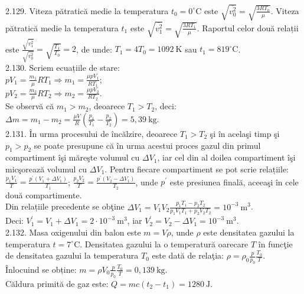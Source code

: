 2.129. Viteza pătratică medie la temperatura $t_{0}=0^{\circ} \mathrm{C}$ este $\sqrt{\overline{v_{0}^{2}}}=\sqrt{\frac{3 R T_{0}}{\mu}}$. Viteza pătratică medie la temperatura $t_{1}$ este $\sqrt{\overline{v_{1}^{2}}}=\sqrt{\frac{3 R T_{1}}{\mu}}$. Raportul celor două relații este $\frac{\sqrt{\overline{v_{1}^{2}}}}{\sqrt{\overline{v_{0}^{2}}}}=\sqrt{\frac{T_{1}}{T_{0}}}=2$, de unde: $T_{1}=4 T_{0}=1092 \mathrm{~K}$ sau $t_{1}=819^{\circ} \mathrm{C}$.\\

2.130. Scriem ecuațiile de stare:\\ $p V_{1}=\frac{m_{1}}{\mu} R T_{1} \Rightarrow m_{1}=\frac{\mu p V_{1}}{R T_{1}}$;\\ $p V_{2}=\frac{m_{2}}{\mu} R T_{2} \Rightarrow m_{2}=\frac{\mu p V_{2}}{R T_{2}}$.\\ Se observă că $m_{1}>m_{2}$, deoarece $T_{1}>T_{2}$, deci:\\ $\Delta m=m_{1}-m_{2}=\frac{\mu V}{R}\left(\frac{p_{1}}{T_{1}}-\frac{p_{2}}{T_{2}}\right)=5,39 \mathrm{~kg}$.\\

2.131. În urma procesului de încălzire, deoarece $T_{1}>T_{2}$ şi în acelaşi timp şi $p_{1}>p_{2}$ se poate presupune că în urma acestui proces gazul din primul compartiment îşi măreşte volumul cu $\Delta V_{1}$, iar cel din al doilea compartiment îşi micşorează volumul cu $\Delta V_{1}$. Pentru fiecare compartiment se pot scrie relațiile:\\ $\frac{p_{1} V_{1}}{T}=\frac{p^{\prime}\left(V_{1}+\Delta V_{1}\right)}{T_{1}}$; \quad $\frac{p_{2} V_{2}}{T}=\frac{p^{\prime}\left(V_{2}-\Delta V_{1}\right)}{T_{2}}$, unde $p^{\prime}$ este presiunea finală, aceeaşi în cele două compartimente.\\ Din relațiile precedente se obţine $\Delta V_{1}=V_{1} V_{2} \frac{p_{1} T_{1}-p_{2} T_{2}}{p_{1} V_{1} T_{1}+p_{2} V_{2} T_{2}}=10^{-3} \mathrm{~m}^{3}$.\\ Deci: $V_{1}^{\prime}=V_{1}+\Delta V_{1}=2 \cdot 10^{-3} \mathrm{~m}^{3}$, iar $V_{2}^{\prime}=V_{2}-\Delta V_{1}=10^{-3} \mathrm{~m}^{3}$.\\

2.132. Masa oxigenului din balon este $m=V \rho$, unde $\rho$ este densitatea gazului la temperatura $t=7^{\circ} \mathrm{C}$. Densitatea gazului la o temperatură oarecare $T$ în funcţie de densitatea gazului la temperatura $T_{0}$ este dată de relaţia: $\rho=\rho_{0} \frac{p}{p_{0}} \frac{T_{0}}{T}$.\\ Înlocuind se obține: $m=\rho V_{0} \frac{p}{p_{0}} \frac{T_{0}}{T}=0,139 \mathrm{~kg}$.\\ Căldura primită de gaz este: $Q=m c\left(t_{2}-t_{1}\right)=1280 \mathrm{~J}$.\\

